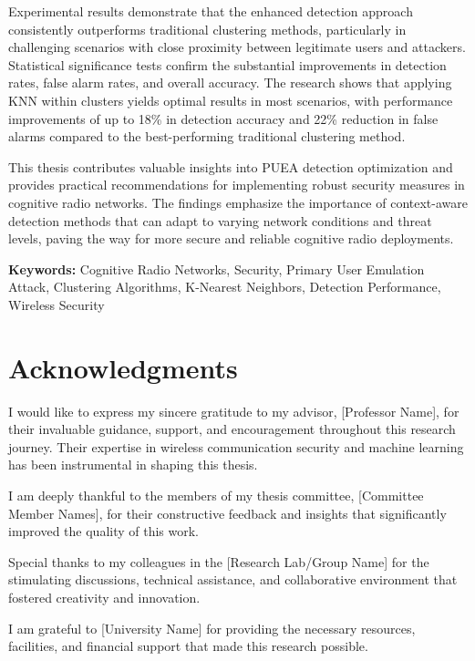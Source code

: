 \documentclass[12pt,a4paper,twoside]{report}
\theoremstyle{mytheoremstyle}
\begin{document}
Experimental results demonstrate that the enhanced detection approach consistently outperforms traditional clustering methods, particularly in challenging scenarios with close proximity between legitimate users and attackers. Statistical significance tests confirm the substantial improvements in detection rates, false alarm rates, and overall accuracy. The research shows that applying KNN within clusters yields optimal results in most scenarios, with performance improvements of up to 18\% in detection accuracy and 22\% reduction in false alarms compared to the best-performing traditional clustering method.

This thesis contributes valuable insights into PUEA detection optimization and provides practical recommendations for implementing robust security measures in cognitive radio networks. The findings emphasize the importance of context-aware detection methods that can adapt to varying network conditions and threat levels, paving the way for more secure and reliable cognitive radio deployments.

\vspace{1cm}
\noindent\textbf{Keywords:} Cognitive Radio Networks, Security, Primary User Emulation Attack, Clustering Algorithms, K-Nearest Neighbors, Detection Performance, Wireless Security

\chapter*{Acknowledgments}

I would like to express my sincere gratitude to my advisor, [Professor Name], for their invaluable guidance, support, and encouragement throughout this research journey. Their expertise in wireless communication security and machine learning has been instrumental in shaping this thesis.

I am deeply thankful to the members of my thesis committee, [Committee Member Names], for their constructive feedback and insights that significantly improved the quality of this work.

Special thanks to my colleagues in the [Research Lab/Group Name] for the stimulating discussions, technical assistance, and collaborative environment that fostered creativity and innovation.

I am grateful to [University Name] for providing the necessary resources, facilities, and financial support that made this research possible.
\end{document}
